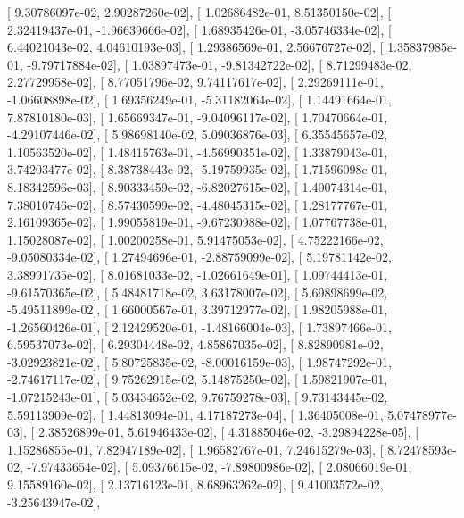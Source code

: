 \documentclass{article}
\begin{document}
       [  9.30786097e-02,   2.90287260e-02],
       [  1.02686482e-01,   8.51350150e-02],
       [  2.32419437e-01,  -1.96639666e-02],
       [  1.68935426e-01,  -3.05746334e-02],
       [  6.44021043e-02,   4.04610193e-03],
       [  1.29386569e-01,   2.56676727e-02],
       [  1.35837985e-01,  -9.79717884e-02],
       [  1.03897473e-01,  -9.81342722e-02],
       [  8.71299483e-02,   2.27729958e-02],
       [  8.77051796e-02,   9.74117617e-02],
       [  2.29269111e-01,  -1.06608898e-02],
       [  1.69356249e-01,  -5.31182064e-02],
       [  1.14491664e-01,   7.87810180e-03],
       [  1.65669347e-01,  -9.04096117e-02],
       [  1.70470664e-01,  -4.29107446e-02],
       [  5.98698140e-02,   5.09036876e-03],
       [  6.35545657e-02,   1.10563520e-02],
       [  1.48415763e-01,  -4.56990351e-02],
       [  1.33879043e-01,   3.74203477e-02],
       [  8.38738443e-02,  -5.19759935e-02],
       [  1.71596098e-01,   8.18342596e-03],
       [  8.90333459e-02,  -6.82027615e-02],
       [  1.40074314e-01,   7.38010746e-02],
       [  8.57430599e-02,  -4.48045315e-02],
       [  1.28177767e-01,   2.16109365e-02],
       [  1.99055819e-01,  -9.67230988e-02],
       [  1.07767738e-01,   1.15028087e-02],
       [  1.00200258e-01,   5.91475053e-02],
       [  4.75222166e-02,  -9.05080334e-02],
       [  1.27494696e-01,  -2.88759099e-02],
       [  5.19781142e-02,   3.38991735e-02],
       [  8.01681033e-02,  -1.02661649e-01],
       [  1.09744413e-01,  -9.61570365e-02],
       [  5.48481718e-02,   3.63178007e-02],
       [  5.69898699e-02,  -5.49511899e-02],
       [  1.66000567e-01,   3.39712977e-02],
       [  1.98205988e-01,  -1.26560426e-01],
       [  2.12429520e-01,  -1.48166004e-03],
       [  1.73897466e-01,   6.59537073e-02],
       [  6.29304448e-02,   4.85867035e-02],
       [  8.82890981e-02,  -3.02923821e-02],
       [  5.80725835e-02,  -8.00016159e-03],
       [  1.98747292e-01,  -2.74617117e-02],
       [  9.75262915e-02,   5.14875250e-02],
       [  1.59821907e-01,  -1.07215243e-01],
       [  5.03434652e-02,   9.76759278e-03],
       [  9.73143445e-02,   5.59113909e-02],
       [  1.44813094e-01,   4.17187273e-04],
       [  1.36405008e-01,   5.07478977e-03],
       [  2.38526899e-01,   5.61946433e-02],
       [  4.31885046e-02,  -3.29894228e-05],
       [  1.15286855e-01,   7.82947189e-02],
       [  1.96582767e-01,   7.24615279e-03],
       [  8.72478593e-02,  -7.97433654e-02],
       [  5.09376615e-02,  -7.89800986e-02],
       [  2.08066019e-01,   9.15589160e-02],
       [  2.13716123e-01,   8.68963262e-02],
       [  9.41003572e-02,  -3.25643947e-02],
\end{document}
